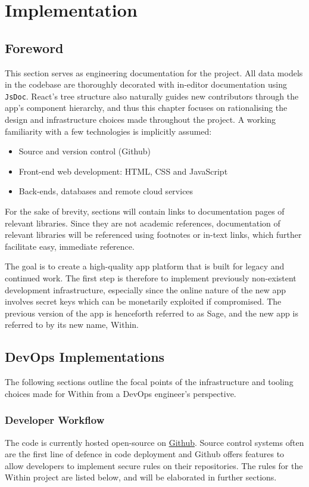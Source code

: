 \chapter{Implementation}
\section{Foreword}
This section serves as engineering documentation for the project. All data models in the codebase are thoroughly decorated with in-editor documentation using \texttt{JsDoc}. React's tree structure also naturally guides new contributors through the app's component hierarchy, and thus this chapter focuses on rationalising the design and infrastructure choices made throughout the project. A working familiarity with a few technologies is implicitly assumed:

\begin{itemize}
    \item Source and version control (Github)
    \item Front-end web development: HTML, CSS and JavaScript
    \item Back-ends, databases and remote cloud services
\end{itemize}

For the sake of brevity, sections will contain links to documentation pages of relevant libraries. Since they are not academic references, documentation of relevant libraries will be referenced using footnotes or in-text links, which further facilitate easy, immediate reference.

The goal is to create a high-quality app platform that is built for legacy and continued work. The first step is therefore to implement previously non-existent development infrastructure, especially since the online nature of the new app involves secret keys which can be monetarily exploited if compromised. The previous version of the app is henceforth referred to as Sage, and the new app is referred to by its new name, Within.


\section{DevOps Implementations}
The following sections outline the focal points of the infrastructure and tooling choices made for Within from a DevOps engineer's perspective.


\subsection{Developer Workflow}
The code is currently hosted open-source on \href{https://github.com/Darrekt/within-react-native}{Github}. Source control systems often are the first line of defence in code deployment and Github offers features to allow developers to implement secure rules on their repositories. The rules for the Within project are listed below, and will be elaborated in further sections.

